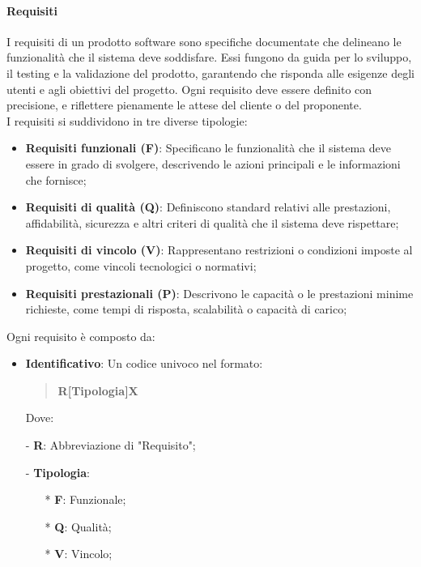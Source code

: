 \documentclass[10pt]{article}
\begin{document}
\begin{justify}
        \paragraph{Requisiti}
        I requisiti di un prodotto software sono specifiche documentate che delineano le funzionalità che il sistema deve soddisfare. Essi fungono da guida per lo sviluppo, il testing e la validazione del prodotto, garantendo che risponda alle esigenze degli utenti e agli obiettivi del progetto. Ogni requisito deve essere definito con precisione, e riflettere pienamente le attese del cliente o del proponente.\\
        I requisiti si suddividono in tre diverse tipologie:
        \begin{itemize}
            \item \textbf{Requisiti funzionali (F)}: Specificano le funzionalità che il sistema deve essere in grado di svolgere, descrivendo le azioni principali e le informazioni che fornisce;
            \item \textbf{Requisiti di qualità (Q)}: Definiscono standard relativi alle prestazioni, affidabilità, sicurezza e altri criteri di qualità che il sistema deve rispettare;
            \item \textbf{Requisiti di vincolo (V)}: Rappresentano restrizioni o condizioni imposte al progetto, come vincoli tecnologici o normativi;
            \item \textbf{Requisiti prestazionali (P)}: Descrivono le capacità o le prestazioni minime richieste, come tempi di risposta, scalabilità o capacità di carico;
        \end{itemize}
        Ogni requisito è composto da:
        \begin{itemize}
            \item \textbf{Identificativo}: Un codice univoco nel formato:
            \begin{quote}
                \textbf{R[{Tipologia}]X}
            \end{quote}
            Dove:
            \item [-] \textbf{R}: Abbreviazione di "Requisito";
            \item [-] \textbf{Tipologia}:
            \begin{itemize}
                \item [*] \textbf{F}: Funzionale;
                \item [*] \textbf{Q}: Qualità;
                \item [*] \textbf{V}: Vincolo;

\end{itemize}
\end{itemize}
\end{justify}
\end{document}
